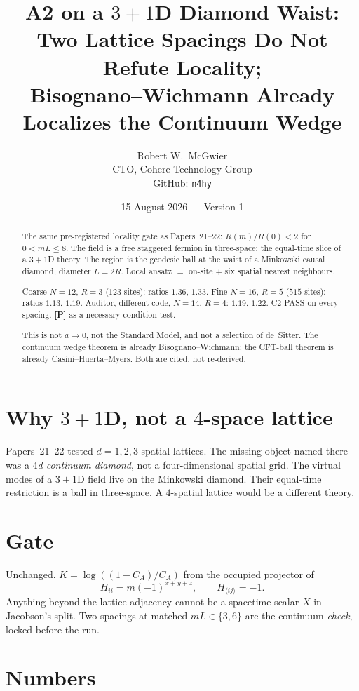 \documentclass[11pt]{article}
\title{\textbf{A2 on a $3{+}1$D Diamond Waist:\\
Two Lattice Spacings Do Not Refute Locality;\\
Bisognano--Wichmann Already Localizes the Continuum Wedge}}
\author{Robert W.\ McGwier\\
\small CTO, Cohere Technology Group\\
\small GitHub: \texttt{n4hy}}
\date{15 August 2026 --- Version 1}
\newcommand{\pP}{\textbf{[P]}}
\begin{document}
\maketitle

\begin{abstract}
\noindent
The same pre-registered locality gate as Papers~21--22:
$R(m)/R(0)<2$ for $0<mL\le 8$. The field is a free staggered
fermion in three-space: the equal-time slice of a $3{+}1$D theory.
The region is the geodesic ball at the waist of a Minkowski causal
diamond, diameter $L=2R$. Local ansatz $=$ on-site $+$ six spatial
nearest neighbours.

Coarse $N=12$, $R=3$ ($123$ sites): ratios $1.36$, $1.33$.
Fine $N=16$, $R=5$ ($515$ sites): ratios $1.13$, $1.19$.
Auditor, different code, $N=14$, $R=4$: $1.19$, $1.22$.
C2 PASS on every spacing. \pP{} as a necessary-condition test.

This is not $a\to 0$, not the Standard Model, and not a selection
of de~Sitter. The continuum wedge theorem is already
Bisognano--Wichmann; the CFT-ball theorem is already
Casini--Huerta--Myers. Both are cited, not re-derived.
\end{abstract}

\section{Why $3{+}1$D, not a $4$-space lattice}

Papers~21--22 tested $d=1,2,3$ spatial lattices. The missing object
named there was a \emph{$4$d continuum diamond}, not a
four-dimensional spatial grid. The virtual modes of a $3{+}1$D
field live on the Minkowski diamond. Their equal-time restriction
is a ball in three-space. A $4$-spatial lattice would be a
different theory.

\section{Gate}

Unchanged. $K=\log((1-C_A)/C_A)$ from the occupied projector of
\[
H_{ii}=m(-1)^{x+y+z},\qquad H_{\langle ij\rangle}=-1.
\]
Anything beyond the lattice adjacency cannot be a spacetime scalar
$X$ in Jacobson's split. Two spacings at matched $mL\in\{3,6\}$
are the continuum \emph{check}, locked before the run.

\section{Numbers}
\end{document}
